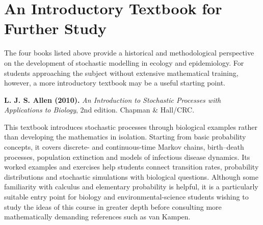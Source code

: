 \section{An Introductory Textbook for Further Study}
\label{sec:introductory_stochastic_textbook}

The four books listed above provide a historical and methodological perspective on the development of stochastic modelling in ecology and epidemiology. For students approaching the subject without extensive mathematical training, however, a more introductory textbook may be a useful starting point.

\noindent\textbf{L. J. S. Allen (2010).} \emph{An Introduction to Stochastic Processes with Applications to Biology}, 2nd edition. Chapman \& Hall/CRC. \citep{Allen2010}

This textbook introduces stochastic processes through biological examples rather than developing the mathematics in isolation. Starting from basic probability concepts, it covers discrete- and continuous-time Markov chains, birth--death processes, population extinction and models of infectious disease dynamics. Its worked examples and exercises help students connect transition rates, probability distributions and stochastic simulations with biological questions. Although some familiarity with calculus and elementary probability is helpful, it is a particularly suitable entry point for biology and environmental-science students wishing to study the ideas of this course in greater depth before consulting more mathematically demanding references such as van Kampen.
